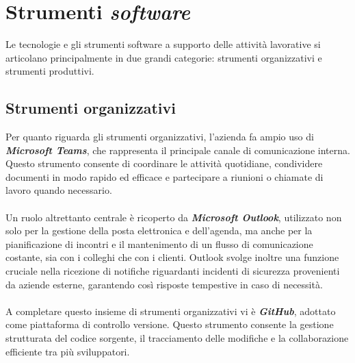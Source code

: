 \section{Strumenti \textit{software}}  
Le tecnologie e gli strumenti software a supporto delle attività lavorative si articolano principalmente in due grandi categorie: strumenti organizzativi e strumenti produttivi.  
\subsection{Strumenti organizzativi}  
Per quanto riguarda gli strumenti organizzativi, l'azienda fa ampio uso di \textbf{\textit{Microsoft Teams}}, che rappresenta il principale canale di comunicazione interna. Questo strumento consente di coordinare le attività quotidiane, condividere documenti in modo rapido ed efficace e partecipare a riunioni o chiamate di lavoro quando necessario.\\\\
Un ruolo altrettanto centrale è ricoperto da \textbf{\textit{Microsoft Outlook}}, utilizzato non solo per la gestione della posta elettronica e dell'agenda, ma anche per la pianificazione di incontri e il mantenimento di un flusso di comunicazione costante, sia con i colleghi che con i clienti. Outlook svolge inoltre una funzione cruciale nella ricezione di notifiche riguardanti incidenti di sicurezza provenienti da aziende esterne, garantendo così risposte tempestive in caso di necessità.\\\\
A completare questo insieme di strumenti organizzativi vi è \textbf{\textit{GitHub}}, adottato come piattaforma di controllo versione. Questo strumento consente la gestione strutturata del codice sorgente, il tracciamento delle modifiche e la collaborazione efficiente tra più sviluppatori.  
